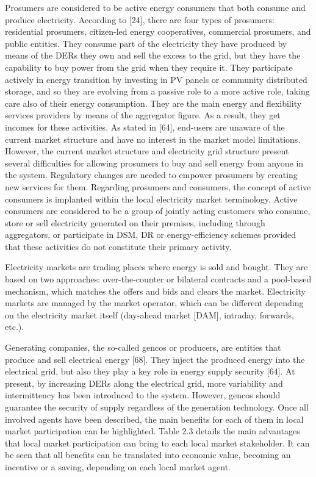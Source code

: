 Prosumers are considered to be active energy consumers that both consume and produce electricity. According to [24], there are four types of prosumers: residential prosumers, citizen-led energy cooperatives, commercial prosumers, and public entities. They consume part of the electricity they have produced by means of the DERs they own and sell the excess to the grid, but they have the capability to buy power from the grid when they require it. They participate actively in energy transition by investing in PV panels or community distributed storage, and so they are evolving from a passive role to a more active role, taking care also of their energy consumption. They are the main energy and flexibility services providers by means of the aggregator figure. As a result, they get incomes for these activities. As stated in [64], end-users are unaware of the current market structure and have no interest in the market model limitations. However, the current market structure and electricity grid structure present several difficulties for allowing prosumers to buy and sell energy from anyone in the system. Regulatory changes are needed to empower prosumers by creating new services for them. Regarding prosumers and consumers, the concept of active consumers is implanted within the local electricity market terminology. Active consumers are considered to be a group of jointly acting customers who consume, store or sell electricity generated on their premises, including through aggregators, or participate in DSM, DR or energy-efficiency schemes provided that these activities do not constitute their primary activity.

Electricity markets are trading places where energy is sold and bought. They are based on two approaches: over-the-counter or bilateral contracts and a pool-based mechanism, which matches the offers and bids and clears the market. Electricity markets are managed by the market operator, which can be different depending on the electricity market itself (day-ahead market [DAM], intraday, forwards, etc.).

Generating companies, the so-called gencos or producers, are entities that produce and sell electrical energy [68]. They inject the produced energy into the electrical grid, but also they play a key role in energy supply security [64]. At present, by increasing DERs along the electrical grid, more variability and intermittency has been introduced to the system. However, gencos should guarantee the security of supply regardless of the generation technology. Once all involved agents have been described, the main benefits for each of them in local market participation can be highlighted. Table 2.3 details the main advantages that local market participation can bring to each local market stakeholder. It can be seen that all benefits can be translated into economic value, becoming an incentive or a saving, depending on each local market agent.


